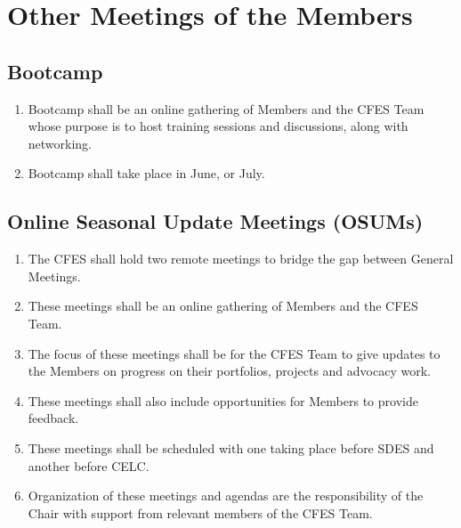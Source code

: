 \section{Other Meetings of the Members}
\label{other-meetings-of-the-members}

\subsection{Bootcamp}
\label{other-meetings-of-the-members-bootcamp}

\begin{enumerate}
 \item Bootcamp shall be an online gathering of Members and the CFES Team whose purpose is to host training sessions and discussions, along with networking.
 \item Bootcamp shall take place in June, or July.
\end{enumerate}

\subsection{Online Seasonal Update Meetings (OSUMs)}
\label{other-meetings-of-the-members-online-seasonal-update-meetings-osums}

\begin{enumerate}
 \item The CFES shall hold two remote meetings to bridge the gap between General Meetings.
 \item These meetings shall be an online gathering of Members and the CFES Team.
 \item The focus of these meetings shall be for the CFES Team to give updates to the Members on progress on their portfolios, projects and advocacy work.
 \item These meetings shall also include opportunities for Members to provide feedback.
 \item These meetings shall be scheduled with one taking place before SDES and another before CELC.
 \item Organization of these meetings and agendas are the responsibility of the Chair with support from relevant members of the CFES Team.
\end{enumerate}
